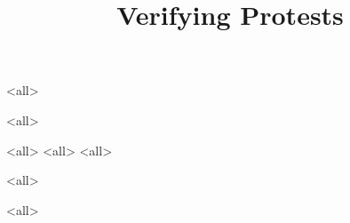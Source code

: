 \title{%
  Verifying Protests
}

\maketitle

\mode*

\begin{abstract}
  
\end{abstract}

\clearpage
\tableofcontents
\clearpage

\mode<all>


\mode<all>


\mode<all>
%
\mode<all>
%
\mode<all>
%

\mode<all>

\mode<all>




\begin{frame}[allowframebreaks]
  \printbibliography{}
\end{frame}
